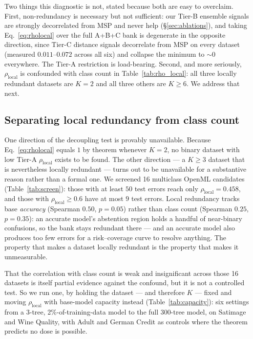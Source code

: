 \documentclass[conference]{IEEEtran}
\begin{document}
Two things this diagnostic is not, stated because both are easy to
overclaim. First, non-redundancy is necessary but not sufficient: our
Tier-B ensemble signals are strongly decorrelated from MSP and never
help (\S\ref{sec:ablations}), and taking Eq.~\ref{eq:rholocal} over the
full A+B+C bank is degenerate in the opposite direction, since Tier-C
distance signals decorrelate from MSP on every dataset (measured
$0.011$--$0.072$ across all six) and collapse the minimum to ${\sim}0$
everywhere. The Tier-A restriction is load-bearing. Second, and more
seriously, $\rho_{\mathrm{local}}$ is confounded with class count in
Table~\ref{tab:rho_local}: all three locally redundant datasets are
$K{=}2$ and all three others are $K \ge 6$. We address that next.

\subsection{Separating local redundancy from class count}
\label{sec:decoupling}

One direction of the decoupling test is provably unavailable. Because
Eq.~\ref{eq:rholocal} equals $1$ by theorem whenever $K{=}2$, no binary
dataset with low Tier-A $\rho_{\mathrm{local}}$ exists to be found. The
other direction --- a $K \ge 3$ dataset that is nevertheless locally
redundant --- turns out to be unavailable for a substantive reason rather
than a formal one. We screened 16 multiclass OpenML candidates
(Table~\ref{tab:screen}): those with at least $50$ test errors reach only
$\rho_{\mathrm{local}} = 0.458$, and those with
$\rho_{\mathrm{local}} \ge 0.6$ have at most $9$ test errors. Local
redundancy tracks base \emph{accuracy} (Spearman $0.50$, $p = 0.05$)
rather than class count (Spearman $0.25$, $p = 0.35$): an accurate
model's abstention region holds a handful of near-binary confusions, so
the bank stays redundant there --- and an accurate model also produces
too few errors for a risk--coverage curve to resolve anything. The
property that makes a dataset locally redundant is the property that
makes it unmeasurable.

That the correlation with class count is weak and insignificant across
those 16 datasets is itself partial evidence against the confound, but it
is not a controlled test. So we run one, by holding the dataset --- and
therefore $K$ --- fixed and moving $\rho_{\mathrm{local}}$ with
base-model capacity instead (Table~\ref{tab:capacity}): six settings from
a 3-tree, 2\%-of-training-data model to the full 300-tree model, on
Satimage and Wine Quality, with Adult and German Credit as controls where
the theorem predicts no dose is possible.
\end{document}
